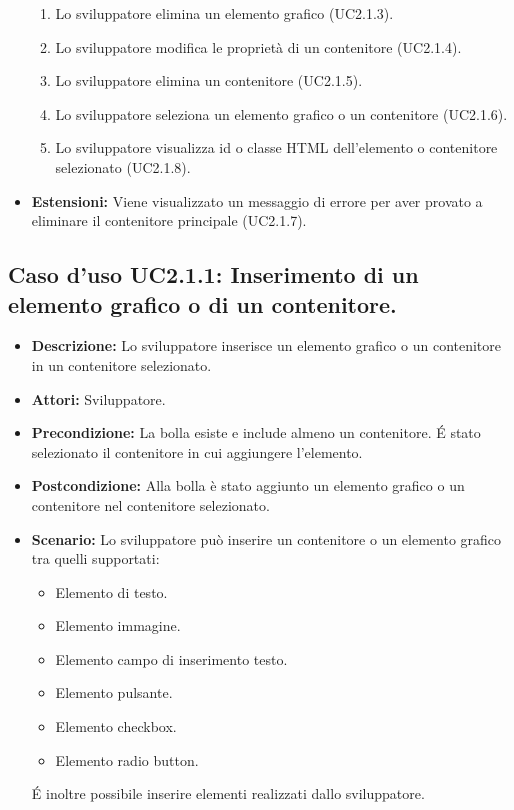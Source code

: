\begin{itemize}
\begin{enumerate}
\item Lo sviluppatore elimina un elemento grafico (UC2.1.3).

\item Lo sviluppatore modifica le proprietà di un contenitore (UC2.1.4).


\item Lo sviluppatore elimina un contenitore (UC2.1.5).

\item Lo sviluppatore seleziona un elemento grafico o un contenitore (UC2.1.6).

\item Lo sviluppatore visualizza id o classe HTML dell'elemento o contenitore selezionato (UC2.1.8).

\end{enumerate} 
\item[]\textbf{Estensioni:}
Viene visualizzato un messaggio di errore per aver provato a eliminare il contenitore principale (UC2.1.7). 
\end{itemize}

\subsection{Caso d'uso UC2.1.1: Inserimento di un elemento grafico o di un contenitore.}
\begin{itemize}
\item[]\textbf{Descrizione:} Lo sviluppatore inserisce un elemento grafico o un contenitore in un contenitore selezionato.
\item[]\textbf{Attori:} Sviluppatore. 
\item[]\textbf{Precondizione:} La bolla esiste e include almeno un contenitore. \'E stato selezionato il contenitore in cui aggiungere l'elemento. 
\item[]\textbf{Postcondizione:} Alla bolla è stato aggiunto un elemento grafico o un contenitore nel contenitore selezionato. 
\item[]\textbf{Scenario:}
Lo sviluppatore può inserire un contenitore o un elemento grafico tra quelli supportati:


\begin{itemize}

\item Elemento di testo.

\item Elemento immagine.

\item Elemento campo di inserimento testo.

\item Elemento pulsante.

\item Elemento checkbox.

\item Elemento radio button.

\end{itemize}

\'E inoltre possibile inserire elementi realizzati dallo sviluppatore. 
\end{itemize}

